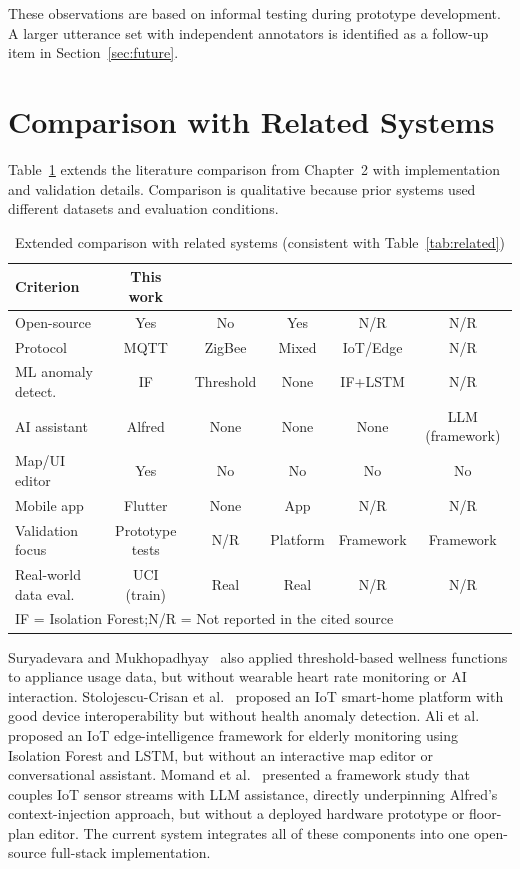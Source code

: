 These observations are based on informal testing during prototype development. A larger utterance set with independent annotators is identified as a follow-up item in Section~\ref{sec:future}.

\section{Comparison with Related Systems}
\label{sec:comparison}

Table~\ref{tab:compare} extends the literature comparison from Chapter~2
with implementation and validation details. Comparison is qualitative
because prior systems used different datasets and evaluation conditions.

\begin{table}[H]
\centering
\caption[Extended comparison with related systems]{Extended comparison with related systems (consistent with Table~\ref{tab:related})}
\label{tab:compare}
\footnotesize
\begin{tabular}{lccccc}
\toprule
\textbf{Criterion} & \textbf{This work} & \cite{Suryadevara2012} & \cite{Stolojescu2021} & \cite{Ali2025} & \cite{Momand2025} \\
\midrule
Open-source        & Yes    & No     & Yes        & N/R     & N/R \\
Protocol           & MQTT   & ZigBee & Mixed      & IoT/Edge & N/R \\
ML anomaly detect. & IF     & Threshold & None    & IF+LSTM  & N/R \\
AI assistant       & Alfred & None   & None       & None    & LLM (framework) \\
Map/UI editor      & Yes    & No     & No         & No      & No \\
Mobile app         & Flutter & None  & App        & N/R     & N/R \\
Validation focus   & Prototype tests & N/R & Platform & Framework & Framework \\
Real-world data eval. & UCI (train) & Real & Real & N/R & N/R \\
\bottomrule
\multicolumn{6}{l}{\footnotesize IF = Isolation Forest;\quad N/R = Not reported in the cited source}
\end{tabular}
\end{table}

Suryadevara and Mukhopadhyay~\cite{Suryadevara2012} also applied threshold-based wellness functions to appliance usage data, but without wearable heart rate monitoring or AI interaction. Stolojescu-Crisan et al.~\cite{Stolojescu2021} proposed an IoT smart-home platform with good device interoperability but without health anomaly detection. Ali et al.~\cite{Ali2025} proposed an IoT edge-intelligence framework for elderly monitoring using Isolation Forest and LSTM, but without an interactive map editor or conversational assistant. Momand et al.~\cite{Momand2025} presented a framework study that couples IoT sensor streams with LLM assistance, directly underpinning Alfred's context-injection approach, but without a deployed hardware prototype or floor-plan editor. The current system integrates all of these components into one open-source full-stack implementation.
